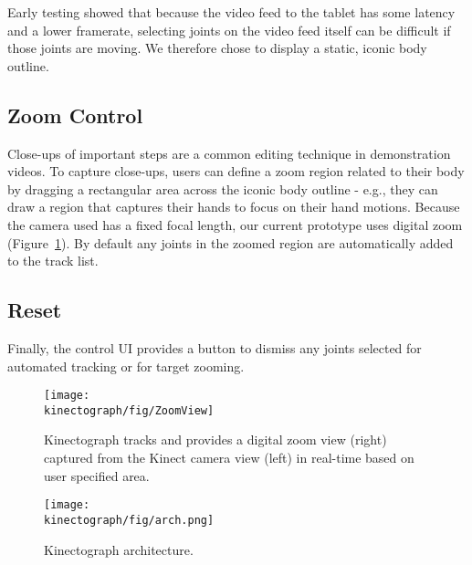 Early testing showed that because the video feed to the tablet has some latency and a lower framerate, selecting joints on the video feed itself can be difficult if those joints are moving. We therefore chose to display a static, iconic body outline.

\subsection{Zoom Control}
Close-ups of important steps are a common editing technique in demonstration videos. To capture close-ups, users can define a zoom region related to their body by dragging a rectangular area across the iconic body outline - e.g., they can draw a region that captures their hands to focus on their hand motions. Because the camera used has a fixed focal length, our current prototype uses digital zoom (Figure~\ref{fig:ZoomView}). By default any joints in the zoomed region are automatically added to the track list.

\subsection{Reset}
Finally, the control UI provides a button to dismiss any joints selected for automated tracking or for target zooming.

\begin{figure}[t]
\centering
\texttt{[image: \\kinectograph/fig/ZoomView]}
\caption{Kinectograph tracks and provides a digital zoom view (right) captured from the Kinect camera view (left) in real-time based on user specified area.}
\label{fig:ZoomView}
\end{figure}

\begin{figure}[t]
\centering
\texttt{[image: \\kinectograph/fig/arch.png]}
\caption{Kinectograph architecture.}
\label{fig:architecture}
\end{figure}
